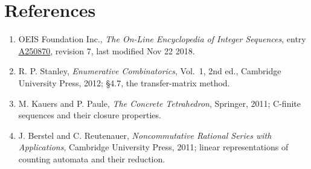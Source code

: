 \documentclass[11pt]{article}
\theoremstyle{definition}
\begin{document}
\section{References}

\begin{enumerate}

\item OEIS Foundation Inc., \emph{The On-Line Encyclopedia of Integer Sequences}, entry \href{https://oeis.org/A250870}{A250870}, revision 7, last modified Nov 22 2018.

\item R. P. Stanley, \emph{Enumerative Combinatorics}, Vol.~1, 2nd ed., Cambridge University Press, 2012; \S4.7, the transfer-matrix method.

\item M. Kauers and P. Paule, \emph{The Concrete Tetrahedron}, Springer, 2011; C-finite sequences and their closure properties.

\item J. Berstel and C. Reutenauer, \emph{Noncommutative Rational Series with Applications}, Cambridge University Press, 2011; linear representations of counting automata and their reduction.

\end{enumerate}
\end{document}
